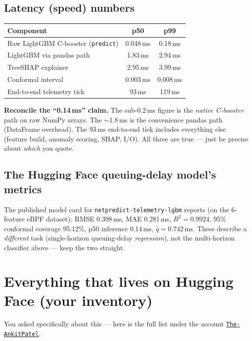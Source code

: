 \documentclass[11pt,a4paper]{article}
\newcommand{\note}[1]{%
  \par\vspace{3pt}\noindent
  \colorbox{soft}{\parbox{\dimexpr\linewidth-2\fboxsep}{\small #1}}%
  \par\vspace{3pt}}
\begin{document}
\subsection{Latency (speed) numbers}
\begin{center}
\begin{tabularx}{\linewidth}{@{}Xcc@{}}
\toprule
\textbf{Component} & \textbf{p50} & \textbf{p99} \\
\midrule
Raw LightGBM C-booster (\texttt{predict}) & 0.048\,ms & 0.18\,ms \\
LightGBM via pandas path & 1.83\,ms & 2.94\,ms \\
TreeSHAP explainer & 2.95\,ms & 3.99\,ms \\
Conformal interval & 0.003\,ms & 0.008\,ms \\
End-to-end telemetry tick & 93\,ms & 119\,ms \\
\bottomrule
\end{tabularx}
\end{center}
\note{\textbf{Reconcile the ``0.14\,ms'' claim.} The sub-0.2\,ms figure is the \emph{native C-booster} path on
raw NumPy arrays. The $\sim$1.8\,ms is the convenience pandas path (DataFrame overhead). The 93\,ms end-to-end
tick includes everything else (feature build, anomaly scoring, SHAP, I/O). All three are true --- just be
precise about \emph{which} you quote.}

\subsection{The Hugging Face queuing-delay model's metrics}
The published model card for \texttt{netpredict-telemetry-lgbm} reports (on the 6-feature eBPF dataset):
RMSE 0.398\,ms, MAE 0.281\,ms, $R^2=0.9924$, 95\% conformal coverage 95.12\%, p50 inference 0.14\,ms,
$\hat q=0.742$\,ms. These describe a \emph{different} task (single-horizon queuing-delay \emph{regression}),
not the multi-horizon classifier above --- keep the two straight.

\section{Everything that lives on Hugging Face (your inventory)}
You asked specifically about this --- here is the full list under the account
\href{https://huggingface.co/The-AnkitPatel}{\texttt{The-AnkitPatel}}.
\end{document}
